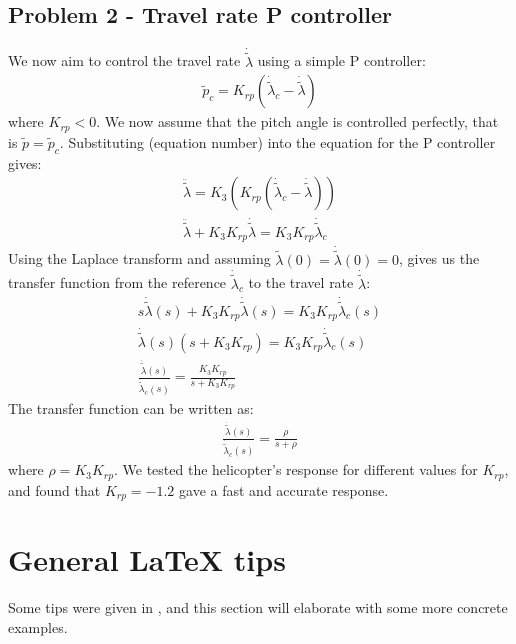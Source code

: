 \subsection{Problem 2 - Travel rate P controller}
We now aim to control the travel rate $\dot{\tilde{\lambda}}$ using a simple P controller:
\begin{gather*}
    \tilde{p}_c = K_{rp}(\dot{\tilde{\lambda}}_c - \dot{\tilde{\lambda}})
\end{gather*}
where $K_{rp} < 0$. We now assume that the pitch angle is controlled perfectly, that is $\tilde{p} = \tilde{p}_c$. Substituting (equation number) into the equation for the P controller gives:
\begin{gather*}
    \ddot{\tilde{\lambda}} = K_3(K_{rp}(\dot{\tilde{\lambda}}_c - \dot{\tilde{\lambda}})) \\ 
    \ddot{\tilde{\lambda}} + K_3K_{rp}\dot{\tilde{\lambda}} = K_3K_{rp}\dot{\tilde{\lambda}}_c
\end{gather*}
Using the Laplace transform and assuming  $\tilde{\lambda}(0) = \dot{\tilde{\lambda}}(0) = 0$, gives us the transfer function from the reference $\dot{\tilde{\lambda}}_c$ to the travel rate $\dot{\tilde{\lambda}}$:
\begin{gather*}
    s\dot{\tilde{\lambda}}(s) + K_3K_{rp}\dot{\tilde{\lambda}}(s) = K_3K_{rp}\dot{\tilde{\lambda}}_c(s) \\
    \dot{\tilde{\lambda}}(s)(s + K_3K_{rp}) = K_3K_{rp}\dot{\tilde{\lambda}}_c(s) \\
    \frac{\dot{\tilde{\lambda}}(s)}{\dot{\tilde{\lambda}}_c(s)} = \frac{K_3K_{rp}}{s + K_3K_{rp}}
\end{gather*}
The transfer function can be written as:
\begin{gather*}
    \frac{ \dot{\tilde{\lambda}}(s)}{\dot{\tilde{\lambda}}_c(s)} = \frac{\rho}{s + \rho}
\end{gather*}
where $\rho = K_3K_{rp}$. We tested the helicopter's response for different values for $K_{rp}$, and found that $K_{rp} = -1.2$ gave a fast and accurate response. 








\newpage
\newcommand{\texMacro}[2]{\texttt{\textbackslash{#1}\{#2\}}}
\section{General LaTeX tips}\label{sec:latex_tips}
Some tips were given in , and this section will elaborate with some more concrete examples.

